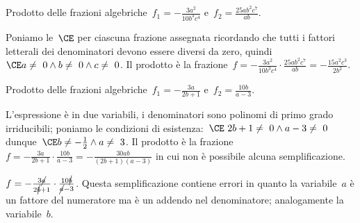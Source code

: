 \begin{exrig}
 \begin{esempio}
Prodotto delle frazioni 
algebriche~$f_{1}=-{\frac{3a^{2}}{10b^{3}c^{4}}}$ 
e~$f_{2}=\frac{25ab^{2}c^{7}}{ab}$.

Poniamo le~$\CE$ per ciascuna frazione assegnata ricordando che tutti i 
fattori letterali dei denominatori devono essere diversi da zero,
quindi~$\CE a\neq~0\wedge b\neq~0\wedge c\neq~0$.
Il prodotto è la 
frazione~$f=-{\frac{3a^{2}}{10b^{3}c^{4}}}\cdot\frac{25ab^{2}c^{7}}{ab}=
-{\frac{15a^{2}c^{3}}{2b^{2}}}$.
 \end{esempio}

 \begin{esempio}
Prodotto delle frazioni algebriche~$f_{1}=-{\frac{3a}{2b+1}}$ 
e~$f_{2}=\frac{10b}{a-3}$.

L'espressione è in due variabili, i denominatori sono polinomi di primo grado 
irriducibili; poniamo le condizioni di
esistenza:~$\CE~2b+1\neq~0\wedge a-3\neq~0$ 
dunque~$\CE b\neq -{\frac{1}{2}}\wedge a\neq~3$.
Il prodotto è la frazione~$f=-{\frac{3a}{2b+1}}\cdot\frac{10b}{a-3}=
-{\frac{30ab}{(2b+1)(a-3)}}$ in cui non è possibile alcuna semplificazione.

\osservazione
$f=-{\frac{3\cancel{a}}{2\cancel{b}+1}}\cdot\frac{10\cancel{b}}{\cancel{a}-3}$. 
Questa semplificazione contiene errori in quanto la variabile~$a$ è un fattore 
del numeratore ma è un addendo nel denominatore; analogamente la variabile~$b$.
 \end{esempio}


\end{exrig}
